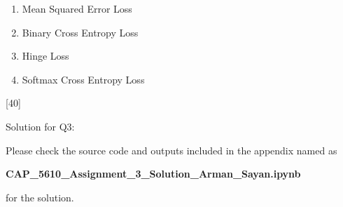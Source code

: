 \documentclass[12pt,letterpaper, onecolumn]{exam}
\begin{document}
\begin{questions}
\begin{parts}
        \begin{enumerate}[label=(\alph*)]
            \item Mean Squared Error Loss
            \item Binary Cross Entropy Loss
            \item Hinge Loss
            \item Softmax Cross Entropy Loss
        \end{enumerate}

        \begin{solution}

        \end{solution}
        
    \end{parts}

    \pagebreak

    [40]

    Solution for Q3:

    \begin{solution}

        Please check the source code and outputs included in the appendix named as

        \begin{center}
            \textbf{CAP\_5610\_Assignment\_3\_Solution\_Arman\_Sayan.ipynb}
        \end{center}
        
        for the solution.
    \end{solution}

    \pagebreak
    
\end{questions}

%      
\end{document}
